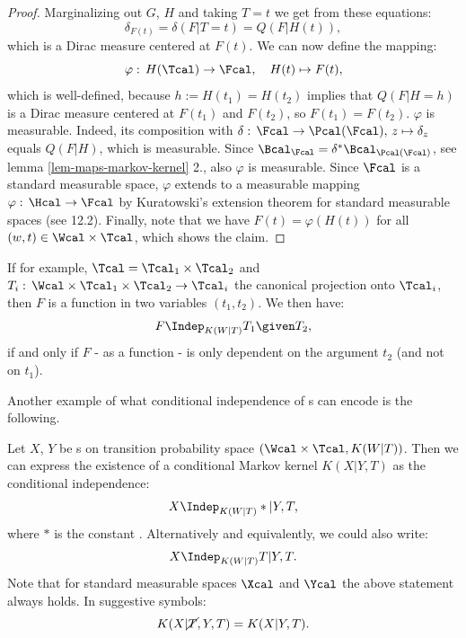 \begin{Lem}
\begin{proof}
    Marginalizing out $G$, $H$ and taking $T=t$ we get from these equations:
    \[ \delta_{F(t)} = \delta(F|T=t) = Q(F|H(t)),\]
    which is a Dirac measure centered at $F(t)$.
    We can now define the mapping:
    \[\varphi:\, H(\Tcal) \to \Fcal, \quad H(t) \mapsto F(t), \]
    which is well-defined, because $h:=H(t_1)=H(t_2)$ implies that $Q(F|H=h)$ is a Dirac measure centered at $F(t_1)$ and $F(t_2)$, so $F(t_1)=F(t_2)$.
    $\varphi$ is measurable.
    Indeed, its composition with $\delta:\,\Fcal \to \Pcal(\Fcal), \, z \mapsto \delta_z$ equals $Q(F|H)$, which is measurable.
    Since $\Bcal_\Fcal = \delta^*\Bcal_{\Pcal(\Fcal)}$, see lemma \ref{lem-maps-markov-kernel} 2., also $\varphi$ is measurable.
    Since $\Fcal$ is a standard measurable space, $\varphi$ extends to a measurable mapping $\varphi:\, \Hcal \to \Fcal$ by Kuratowski's extension theorem for standard measurable spaces (see \cite{Kec95} 12.2). 
    Finally, note that we have $F(t) = \varphi(H(t))$ for all $(w,t) \in \Wcal \times \Tcal$, which shows the claim.
\end{proof}
\end{Lem}


\begin{Eg}
    If for example, $\Tcal = \Tcal_1 \times \Tcal_2$ and $T_i:\,\Wcal \times \Tcal_1 \times \Tcal_2 \to \Tcal_i$ the canonical projection onto $\Tcal_i$,
    then $F$ is a function in two variables $(t_1,t_2)$.
    We then  have:
    \[ F \Indep_{K(W|T)} T_1 \given T_2,\]
    if and only if $F$ - as a function - is only dependent on the argument $t_2$ (and not on $t_1$).
\end{Eg}

Another example of what conditional independence of \trv{}s can encode is the following.

\begin{Rem}
    \label{conditional-markov-kernel-as-ci}
    Let $X$, $Y$ be \trv{}s on transition probability space $(\Wcal \times \Tcal, K(W|T))$.
    Then we can express the existence of a conditional Markov kernel $K(X|Y,T)$ as the conditional independence:
    \[ X\Indep_{K(W|T)} \ast|Y,T,  \]
    where $\ast$ is the constant \trv{}. Alternatively and equivalently, we could also write:
    \[ X\Indep_{K(W|T)} T|Y,T.  \]
    Note that for standard measurable spaces $\Xcal$ and $\Ycal$ the above statement always holds.
    In suggestive symbols:
    \[ K(X|\cancel{T},Y,T) = K(X|Y,T). \]
\end{Rem}

